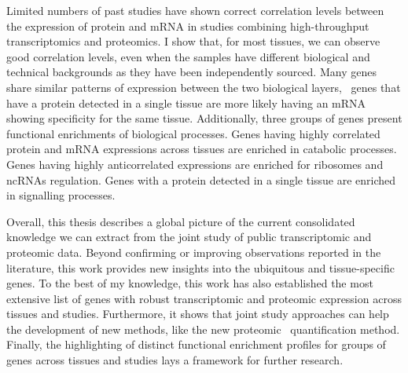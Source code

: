 \begin{singlespace}
{    Limited numbers of past studies have shown correct correlation levels
    between the expression of protein and mRNA
    in studies combining high-throughput transcriptomics and proteomics.
    I show that, for most tissues,
    we can observe good correlation levels,
    even when the samples have different biological and technical backgrounds
    as they have been independently sourced.
    Many genes share similar patterns of expression
    between the two biological layers,
    \eg\ genes that have a protein detected in a single tissue
    are more likely having an mRNA showing specificity for the same tissue.
    Additionally, three groups of genes present functional enrichments
    of biological processes.
    Genes having highly correlated protein and mRNA expressions across tissues
    are enriched in catabolic processes.
    Genes having highly anticorrelated expressions are enriched
    for ribosomes and ncRNAs regulation.
    Genes with a protein detected in a single tissue are enriched
    in signalling processes.\mybr\

    Overall, this thesis describes a global picture
    of the current consolidated knowledge
    we can extract from the joint study
    of public transcriptomic and proteomic data.
    Beyond confirming or improving observations reported in the literature,
    this work provides new insights
    into the ubiquitous and tissue-specific genes.
    To the best of my knowledge,
    this work has also established the most extensive list of genes
    with robust transcriptomic and proteomic expression across tissues and studies.
    Furthermore, it shows that joint study approaches can help the development
    of new methods, like the new proteomic \PPKM\ quantification method.
    Finally, the highlighting of distinct functional enrichment profiles
    for groups of genes across tissues and studies
    lays a framework for further research.\mybr\
    }
\end{singlespace}
